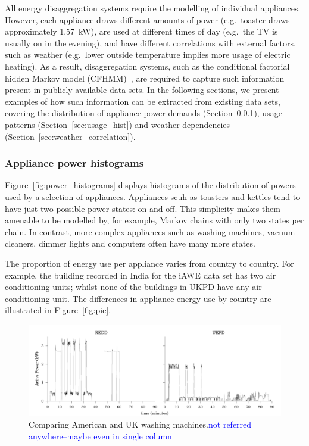 \documentclass{sig-alternate}
\newcommand{\bluecolor}[1]{\textcolor{blue}{#1}}
\newcommand{\secref}[1]{Section~\ref{#1}}
\begin{document}
All energy disaggregation systems require the modelling of individual appliances. However, each appliance draws different amounts of power (e.g.\ toaster draws approximately 1.57~kW), are used at different times of day (e.g.\ the TV is usually on in the evening), and have different correlations with external factors, such as weather (e.g.\ lower outside temperature implies more usage of electric heating). As a result, disaggregation systems, such as the conditional factorial hidden Markov model (CFHMM)~\cite{kim_2011}, are required to capture such information present in publicly available data sets. In the following sections, we present examples of how such information can be extracted from existing data sets, covering the distribution of appliance power demands (\secref{sec:power_hist}), usage patterns (\secref{sec:usage_hist}) and weather dependencies (\secref{sec:weather_correlation}).

\subsubsection{Appliance power histograms}
\label{sec:power_hist}
\noindent
Figure~\ref{fig:power_histograms} displays histograms of the
distribution of powers used by a selection of appliances.  Appliances
scuh as toasters and kettles tend to have just two possible power states:
on and off.  This simplicity makes them amenable to be modelled by,
for example, Markov chains with only two states per chain.  In contrast, more complex appliances
such as washing machines, vacuum cleaners, dimmer lights and computers often
have many more states.

The proportion of energy use per appliance varies from country to
country. For example, the building recorded in India for the iAWE
data set has two air conditioning units; whilst none of the buildings
in UKPD have any air conditioning unit.  The differences in appliance
energy use by country are illustrated in Figure~\ref{fig:pie}.

\begin{figure}
  \centering
  \includegraphics[width=\columnwidth]{figures/wm.pdf}
  \caption{Comparing American and UK washing machines.\bluecolor{not referred anywhere--maybe even in single column}}
  \label{fig:wm}
\end{figure} 
\end{document}
